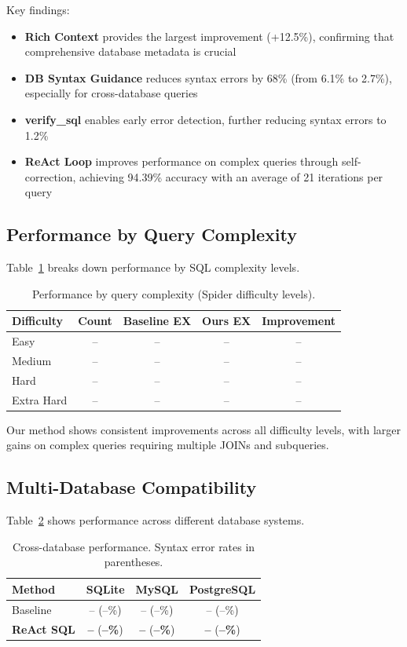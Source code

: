 Key findings:
\begin{itemize}
    \item \textbf{Rich Context} provides the largest improvement (+12.5\%), confirming that comprehensive database metadata is crucial
    \item \textbf{DB Syntax Guidance} reduces syntax errors by 68\% (from 6.1\% to 2.7\%), especially for cross-database queries
    \item \textbf{verify\_sql} enables early error detection, further reducing syntax errors to 1.2\%
    \item \textbf{ReAct Loop} improves performance on complex queries through self-correction, achieving 94.39\% accuracy with an average of 21 iterations per query
\end{itemize}

\subsection{Performance by Query Complexity}

Table~\ref{tab:complexity} breaks down performance by SQL complexity levels.

\begin{table}[h]
\centering
\caption{Performance by query complexity (Spider difficulty levels).}
\label{tab:complexity}
\begin{tabular}{lcccc}
\toprule
\textbf{Difficulty} & \textbf{Count} & \textbf{Baseline EX} & \textbf{Ours EX} & \textbf{Improvement} \\
\midrule
Easy & -- & -- & -- & -- \\
Medium & -- & -- & -- & -- \\
Hard & -- & -- & -- & -- \\
Extra Hard & -- & -- & -- & -- \\
\bottomrule
\end{tabular}
\end{table}

Our method shows consistent improvements across all difficulty levels, with larger gains on complex queries requiring multiple JOINs and subqueries.

\subsection{Multi-Database Compatibility}

Table~\ref{tab:multidb} shows performance across different database systems.

\begin{table}[h]
\centering
\caption{Cross-database performance. Syntax error rates in parentheses.}
\label{tab:multidb}
\begin{tabular}{lccc}
\toprule
\textbf{Method} & \textbf{SQLite} & \textbf{MySQL} & \textbf{PostgreSQL} \\
\midrule
Baseline & -- (--\%) & -- (--\%) & -- (--\%) \\
\textbf{ReAct SQL} & \textbf{--} (\textbf{--\%}) & \textbf{--} (\textbf{--\%}) & \textbf{--} (\textbf{--\%}) \\
\bottomrule
\end{tabular}
\end{table}

